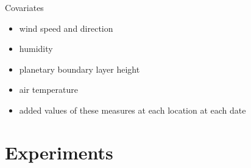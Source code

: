 \documentclass[notheorems,envcountsect,allowframebreaks,xcolor=svgnames,8pt]{beamer}
\begin{document}
\begin{frame}{Covariates}
\begin{itemize}	
\item wind speed and direction
\item humidity
\item planetary boundary layer height
\item air temperature
\item added values of these measures at each location at each date
\end{itemize}
\end{frame}

\section{Experiments}
\end{document}
